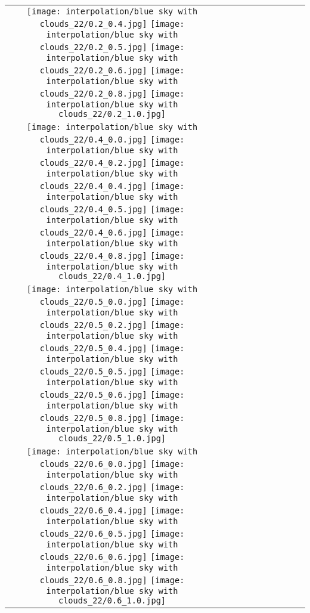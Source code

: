 \documentclass[10pt,twocolumn,letterpaper]{article}
\begin{document}
\begin{figure*}[tb!]
{\begin{tabular}{c c c c c c c c c c}
  \texttt{[image: interpolation/blue sky with clouds\_22/0.2\_0.4.jpg]}
  \texttt{[image: interpolation/blue sky with clouds\_22/0.2\_0.5.jpg]}
  \texttt{[image: interpolation/blue sky with clouds\_22/0.2\_0.6.jpg]}
  \texttt{[image: interpolation/blue sky with clouds\_22/0.2\_0.8.jpg]}
  \texttt{[image: interpolation/blue sky with clouds\_22/0.2\_1.0.jpg]}
\tabularnewline
    \raisebox{0.1in}{\rotatebox{90}{\small \emph{$0.4$}
 }}
  \texttt{[image: interpolation/blue sky with clouds\_22/0.4\_0.0.jpg]}
  \texttt{[image: interpolation/blue sky with clouds\_22/0.4\_0.2.jpg]}
  \texttt{[image: interpolation/blue sky with clouds\_22/0.4\_0.4.jpg]}
  \texttt{[image: interpolation/blue sky with clouds\_22/0.4\_0.5.jpg]}
  \texttt{[image: interpolation/blue sky with clouds\_22/0.4\_0.6.jpg]}
  \texttt{[image: interpolation/blue sky with clouds\_22/0.4\_0.8.jpg]}
  \texttt{[image: interpolation/blue sky with clouds\_22/0.4\_1.0.jpg]}
\tabularnewline
    \raisebox{0.1in}{\rotatebox{90}{\small \emph{$0.5$}
 }}
  \texttt{[image: interpolation/blue sky with clouds\_22/0.5\_0.0.jpg]}
  \texttt{[image: interpolation/blue sky with clouds\_22/0.5\_0.2.jpg]}
  \texttt{[image: interpolation/blue sky with clouds\_22/0.5\_0.4.jpg]}
  \texttt{[image: interpolation/blue sky with clouds\_22/0.5\_0.5.jpg]}
  \texttt{[image: interpolation/blue sky with clouds\_22/0.5\_0.6.jpg]}
  \texttt{[image: interpolation/blue sky with clouds\_22/0.5\_0.8.jpg]}
  \texttt{[image: interpolation/blue sky with clouds\_22/0.5\_1.0.jpg]}
\tabularnewline
    \raisebox{0.1in}{\rotatebox{90}{\small \emph{$0.6$}
 }}
  \texttt{[image: interpolation/blue sky with clouds\_22/0.6\_0.0.jpg]}
  \texttt{[image: interpolation/blue sky with clouds\_22/0.6\_0.2.jpg]}
  \texttt{[image: interpolation/blue sky with clouds\_22/0.6\_0.4.jpg]}
  \texttt{[image: interpolation/blue sky with clouds\_22/0.6\_0.5.jpg]}
  \texttt{[image: interpolation/blue sky with clouds\_22/0.6\_0.6.jpg]}
  \texttt{[image: interpolation/blue sky with clouds\_22/0.6\_0.8.jpg]}
  \texttt{[image: interpolation/blue sky with clouds\_22/0.6\_1.0.jpg]}

\end{tabular}}
\end{figure*}
\end{document}
